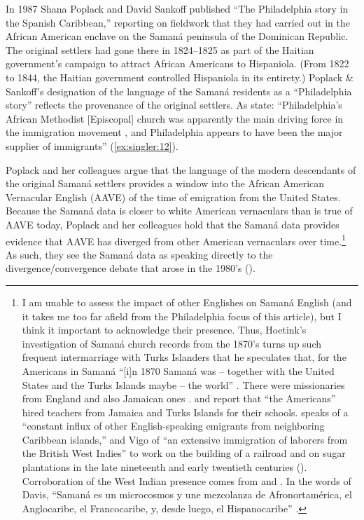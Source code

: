 \documentclass[output=paper,colorlinks,citecolor=brown]{langscibook}
\begin{document}
In 1987 Shana Poplack and David Sankoff published “The Philadelphia story in the Spanish Caribbean,” reporting on fieldwork that they had carried out in the African American enclave on the Samaná peninsula of the Dominican Republic. The original settlers had gone there in 1824--1825 as part of the Haitian government’s campaign to attract African Americans to Hispaniola. (From 1822 to 1844, the Haitian government controlled Hispaniola in its entirety.) Poplack \& Sankoff’s designation of the language of the Samaná residents as a “Philadelphia story” reflects the provenance of the original settlers. As \citet{PoplackTagliamonte2001} state: “Philadelphia’s African Methodist [Episcopal] church was apparently the main driving force in the immigration movement \citep[243]{Nash1988}, and Philadelphia appears to have been the major supplier of immigrants” (\ref{ex:singler:12}). 

Poplack and her colleagues argue that the language of the modern descendants of the original Samaná settlers provides a window into the African American Vernacular English (AAVE) of the time of emigration from the United States. Because the Samaná data is closer to white American vernaculars than is true of AAVE today, Poplack and her colleagues hold that the Samaná data provides evidence that AAVE has diverged from other American vernaculars over time.\footnote{I am unable to assess the impact of other Englishes on Samaná English (and it takes me too far afield from the Philadelphia focus of this article), but I think it important to acknowledge their presence. Thus, Hoetink’s investigation of Samaná church records from the 1870's turns up such frequent intermarriage with Turks Islanders that he speculates that, for the Americans in Samaná “[i]n 1870 Samaná was -- together with the United States and the Turks Islands maybe -- the world” \citep[21]{Hoetink1962}. There were missionaries from England and also Jamaican ones \citep[14]{Hoetink1962}. \citet{Vigo1982} and \citet{Davis2007} report that “the Americans” hired teachers from Jamaica and Turks Islands for their schools. \citet[224]{Mann-Hamilton2013} speaks of a “constant influx of other English-speaking emigrants from neighboring Caribbean islands,” and Vigo of “an extensive immigration of laborers from the British West Indies” to work on the building of a railroad and on sugar plantations in the late nineteenth and early twentieth centuries (\citeyear[6]{Vigo1987}). Corroboration of the West Indian presence comes from \citet{Parsons1928} and \citet{MillerKrieger1928}.  In the words of Davis, “Samaná es un microcosmos y une mezcolanza de Afronortamérica, el Anglocaribe, el Francocaribe, y, desde luego, el Hispanocaribe” \citep[166]{Davis1980}.} As such, they see the Samaná data as speaking directly to the divergence/convergence debate that arose in the 1980’s (\citealt{LabovHarris1986, FasoldRickford1987}).
\end{document}

